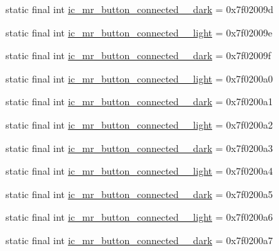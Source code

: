 \begin{CompactItemize}
\item 
static final int \hyperlink{classandroid_1_1support_1_1v7_1_1mediarouter_1_1_r_1_1drawable_c029dc7d3a514e8b0e9c8182d7ce07e7}{ic\_\-mr\_\-button\_\-connected\_\_\-dark} = 0x7f02009d
\item 
static final int \hyperlink{classandroid_1_1support_1_1v7_1_1mediarouter_1_1_r_1_1drawable_5052048d3914b423a8abe43177764087}{ic\_\-mr\_\-button\_\-connected\_\_\-light} = 0x7f02009e
\item 
static final int \hyperlink{classandroid_1_1support_1_1v7_1_1mediarouter_1_1_r_1_1drawable_7f68c205dd14554ff8d125fa7f118fb9}{ic\_\-mr\_\-button\_\-connected\_\_\-dark} = 0x7f02009f
\item 
static final int \hyperlink{classandroid_1_1support_1_1v7_1_1mediarouter_1_1_r_1_1drawable_e3dd5d49a52a833a03038818de8f2ffd}{ic\_\-mr\_\-button\_\-connected\_\_\-light} = 0x7f0200a0
\item 
static final int \hyperlink{classandroid_1_1support_1_1v7_1_1mediarouter_1_1_r_1_1drawable_c4f3938a5d449a2ab71e1b0ed811ce96}{ic\_\-mr\_\-button\_\-connected\_\_\-dark} = 0x7f0200a1
\item 
static final int \hyperlink{classandroid_1_1support_1_1v7_1_1mediarouter_1_1_r_1_1drawable_d8c2027b6679dfbc733444600604ff0d}{ic\_\-mr\_\-button\_\-connected\_\_\-light} = 0x7f0200a2
\item 
static final int \hyperlink{classandroid_1_1support_1_1v7_1_1mediarouter_1_1_r_1_1drawable_b693e1dedce00c46c621548511376efb}{ic\_\-mr\_\-button\_\-connected\_\_\-dark} = 0x7f0200a3
\item 
static final int \hyperlink{classandroid_1_1support_1_1v7_1_1mediarouter_1_1_r_1_1drawable_66f8596fb2cb781cf7edf1b10958d39c}{ic\_\-mr\_\-button\_\-connected\_\_\-light} = 0x7f0200a4
\item 
static final int \hyperlink{classandroid_1_1support_1_1v7_1_1mediarouter_1_1_r_1_1drawable_382c29b98c5c0076520eac58f3051c3f}{ic\_\-mr\_\-button\_\-connected\_\_\-dark} = 0x7f0200a5
\item 
static final int \hyperlink{classandroid_1_1support_1_1v7_1_1mediarouter_1_1_r_1_1drawable_9c68382feab63fcc56cca2d1e18772e3}{ic\_\-mr\_\-button\_\-connected\_\_\-light} = 0x7f0200a6
\item 
static final int \hyperlink{classandroid_1_1support_1_1v7_1_1mediarouter_1_1_r_1_1drawable_9a1439116b15f52df436f646cfeec346}{ic\_\-mr\_\-button\_\-connected\_\_\-dark} = 0x7f0200a7
\item 

\end{CompactItemize}
